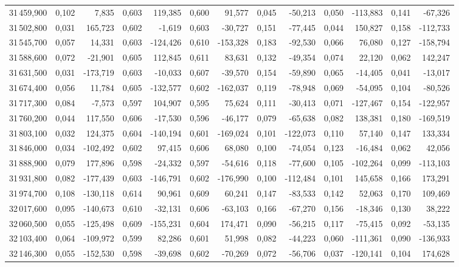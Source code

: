 \begin{longtable}{rrrrrrrrrrrrr}
31\,459,900 & 0,102 & 7,835 & 0,603 & 119,385 & 0,600 & 91,577 & 0,045 & -50,213 & 0,050 & -113,883 & 0,141 & -67,326\\
31\,502,800 & 0,031 & 165,723 & 0,602 & -1,619 & 0,603 & -30,727 & 0,151 & -77,445 & 0,044 & 150,827 & 0,158 & -112,733\\
31\,545,700 & 0,057 & 14,331 & 0,603 & -124,426 & 0,610 & -153,328 & 0,183 & -92,530 & 0,066 & 76,080 & 0,127 & -158,794\\
31\,588,600 & 0,072 & -21,901 & 0,605 & 112,845 & 0,611 & 83,631 & 0,132 & -49,354 & 0,074 & 22,120 & 0,062 & 142,247\\
31\,631,500 & 0,031 & -173,719 & 0,603 & -10,033 & 0,607 & -39,570 & 0,154 & -59,890 & 0,065 & -14,405 & 0,041 & -13,017\\
31\,674,400 & 0,056 & 11,784 & 0,605 & -132,577 & 0,602 & -162,037 & 0,119 & -78,948 & 0,069 & -54,095 & 0,104 & -80,526\\
31\,717,300 & 0,084 & -7,573 & 0,597 & 104,907 & 0,595 & 75,624 & 0,111 & -30,413 & 0,071 & -127,467 & 0,154 & -122,957\\
31\,760,200 & 0,044 & 117,550 & 0,606 & -17,530 & 0,596 & -46,177 & 0,079 & -65,638 & 0,082 & 138,381 & 0,180 & -169,519\\
31\,803,100 & 0,032 & 124,375 & 0,604 & -140,194 & 0,601 & -169,024 & 0,101 & -122,073 & 0,110 & 57,140 & 0,147 & 133,334\\
31\,846,000 & 0,034 & -102,492 & 0,602 & 97,415 & 0,606 & 68,080 & 0,100 & -74,054 & 0,123 & -16,484 & 0,062 & 42,056\\
31\,888,900 & 0,079 & 177,896 & 0,598 & -24,332 & 0,597 & -54,616 & 0,118 & -77,600 & 0,105 & -102,264 & 0,099 & -113,103\\
31\,931,800 & 0,082 & -177,439 & 0,603 & -146,791 & 0,602 & -176,990 & 0,100 & -112,484 & 0,101 & 145,658 & 0,166 & 173,291\\
31\,974,700 & 0,108 & -130,118 & 0,614 & 90,961 & 0,609 & 60,241 & 0,147 & -83,533 & 0,142 & 52,063 & 0,170 & 109,469\\
32\,017,600 & 0,095 & -140,673 & 0,610 & -32,131 & 0,606 & -63,103 & 0,166 & -67,270 & 0,156 & -18,346 & 0,130 & 38,222\\
32\,060,500 & 0,055 & -125,498 & 0,609 & -155,231 & 0,604 & 174,471 & 0,090 & -56,215 & 0,117 & -75,415 & 0,092 & -53,135\\
32\,103,400 & 0,064 & -109,972 & 0,599 & 82,286 & 0,601 & 51,998 & 0,082 & -44,223 & 0,060 & -111,361 & 0,090 & -136,933\\
32\,146,300 & 0,055 & -152,530 & 0,598 & -39,698 & 0,602 & -70,269 & 0,072 & -56,706 & 0,037 & -120,141 & 0,104 & 174,628\\

\end{longtable}
